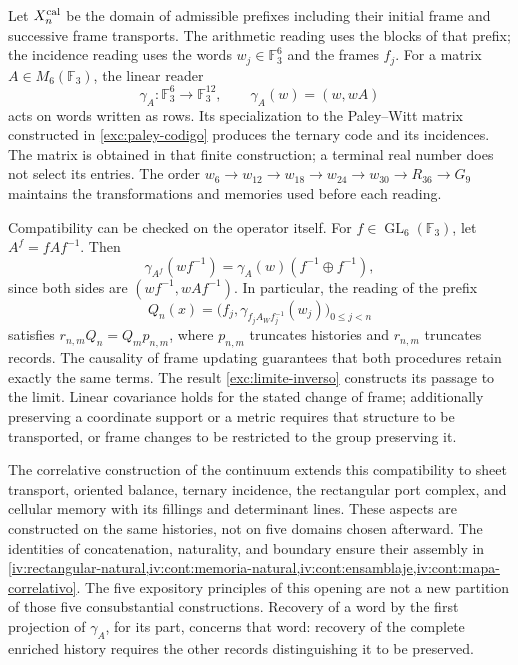Let \(X_n^{\rm cal}\) be the domain of admissible prefixes including
their initial frame and successive frame transports. The arithmetic reading
uses the blocks of that prefix; the incidence reading uses the words
\(w_j\in\mathbb F_3^6\) and the frames \(f_j\). For a matrix
\(A\in M_6(\mathbb F_3)\), the linear reader
\[
 \gamma_A:\mathbb F_3^6\longrightarrow\mathbb F_3^{12},
 \qquad \gamma_A(w)=(w,wA)
\]
acts on words written as rows. Its specialization to the
Paley--Witt matrix constructed in \cref{exc:paley-codigo} produces the ternary
code and its incidences. The matrix is obtained in that finite
construction; a terminal real number does not select its entries. The order
\(w_6\to w_{12}\to w_{18}\to w_{24}\to w_{30}\to R_{36}\to G_9\)
maintains the transformations and memories used before each reading.

Compatibility can be checked on the operator itself. For
\(f\in\operatorname{GL}_6(\mathbb F_3)\), let
\(A^f=fAf^{-1}\). Then
\[
 \gamma_{A^f}(wf^{-1})
      =\gamma_A(w)(f^{-1}\oplus f^{-1}),
\]
since both sides are \((wf^{-1},wAf^{-1})\). In particular, the reading
of the prefix
\[
 Q_n(x)=\bigl(f_j,
       \gamma_{f_jA_Wf_j^{-1}}(w_j)\bigr)_{0\leq j<n}
\]
satisfies \(r_{n,m}Q_n=Q_m p_{n,m}\), where \(p_{n,m}\) truncates
histories and \(r_{n,m}\) truncates records. The causality of
frame updating guarantees that both procedures retain
exactly the same terms. The result
\cref{exc:limite-inverso} constructs its passage to the limit. Linear covariance
holds for the stated change of frame; additionally preserving a coordinate
support or a metric requires that structure to be transported, or
frame changes to be restricted to the group preserving it.

The correlative construction of the continuum extends this compatibility to
sheet transport, oriented balance, ternary incidence, the
rectangular port complex, and cellular memory with its fillings and
determinant lines. These aspects are constructed on the same
histories, not on five domains chosen afterward. The identities of
concatenation, naturality, and boundary ensure their assembly in
\cref{iv:rectangular-natural,iv:cont:memoria-natural,iv:cont:ensamblaje,iv:cont:mapa-correlativo}.
The five expository principles of this opening are not a new
partition of those five consubstantial constructions. Recovery
of a word by the first projection of \(\gamma_A\), for its
part, concerns that word: recovery of the complete enriched
history requires the other records distinguishing it to be preserved.

